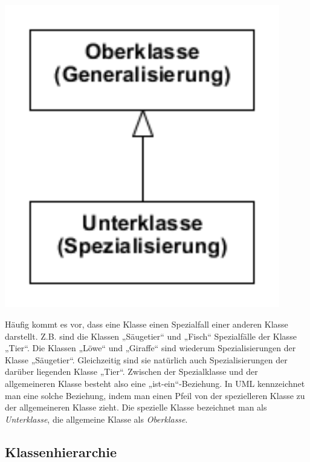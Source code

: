 \begin{minipage}{0.25\textwidth}
\begin{center}
\includegraphics[width=0.9\textwidth]{./inf/SEKII/15_UML_Klassendiagramme/Vererbung.png}
\end{center}
\end{minipage}
\begin{minipage}{0.75\textwidth}
Häufig kommt es vor, dass eine Klasse einen Spezialfall einer anderen Klasse
darstellt. Z.B. sind die Klassen „Säugetier“ und „Fisch“ Spezialfälle der Klasse
„Tier“. Die Klassen „Löwe“ und „Giraffe“ sind wiederum Spezialisierungen der
Klasse „Säugetier“. Gleichzeitig sind sie natürlich auch Spezialisierungen der
darüber liegenden Klasse „Tier“. Zwischen der Spezialklasse und der
allgemeineren Klasse besteht also eine „ist-ein“-Beziehung. In UML kennzeichnet
man eine solche Beziehung, indem man einen Pfeil von der spezielleren Klasse zu
der allgemeineren Klasse zieht. Die spezielle Klasse bezeichnet man als
\emph{Unterklasse}, die allgemeine Klasse als \emph{Oberklasse}.
\end{minipage}


\subsection{Klassenhierarchie}

